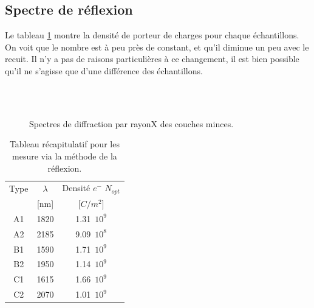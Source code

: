 \documentclass[a4paper,12pt,oneside]{article}
\begin{document}
\subsection{Spectre de réflexion}

Le tableau \ref{fig:diff_main} montre la densité de porteur de charges pour chaque échantillons. On voit que le nombre est à peu près de constant, et qu'il diminue un peu avec le recuit. Il n'y a pas de raisons particulières à ce changement, il est bien possible qu'il ne s'agisse que d'une différence des échantillons.

\begin{figure}[!ht]
	\\
	\hfill
	\hfill
	\\
	\begin{center}
	\end{center}
	\caption{Spectres de diffraction par rayonX des couches minces.}
	\label{fig:diff_main}
\end{figure}

\begin{table}[ht]
   \centering
   \begin{tabular}{|c|c|c|}
	  \hline
      Type & $\lambda$ & Densité $e^{-}$ $N_{opt}$\\
      & [nm] & [$C/m^2$]\\
      \hline
      A1 & 1820 & 1.31\ $10^{9}$\\
      A2 & 2185 & 9.09\ $10^{8}$\\
      B1 & 1590 & 1.71\ $10^{9}$\\
      B2 & 1950 & 1.14\ $10^{9}$\\
      C1 & 1615 & 1.66\ $10^{9}$\\
      C2 & 2070 & 1.01\ $10^{9}$\\
      \hline
   \end{tabular}
   \caption{Tableau récapitulatif pour les mesure via la méthode de la réflexion.}\label{tab:reflexion}
\end{table}
\end{document}
